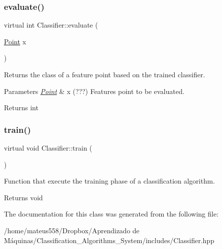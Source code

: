 \subsubsection{\texorpdfstring{evaluate()}{evaluate()}}
{\footnotesize\ttfamily virtual int Classifier\+::evaluate (\begin{DoxyParamCaption}\item[{\hyperlink{class_point}{Point}}]{x }\end{DoxyParamCaption})\hspace{0.3cm}{\ttfamily [pure virtual]}}



Returns the class of a feature point based on the trained classifier. 


\begin{DoxyParams}{Parameters}
{\em \hyperlink{class_point}{Point}} & x (???) Features point to be evaluated. \\
\hline
\end{DoxyParams}
\begin{DoxyReturn}{Returns}
int 
\end{DoxyReturn}
\mbox{\label{class_classifier_a4e2f077e6f1dce1ef0376a02b60e7c21}} 
\subsubsection{\texorpdfstring{train()}{train()}}
{\footnotesize\ttfamily virtual void Classifier\+::train (\begin{DoxyParamCaption}{ }\end{DoxyParamCaption})\hspace{0.3cm}{\ttfamily [pure virtual]}}



Function that execute the training phase of a classification algorithm. 

\begin{DoxyReturn}{Returns}
void 
\end{DoxyReturn}


The documentation for this class was generated from the following file\+:\begin{DoxyCompactItemize}
\item 
/home/mateus558/\+Dropbox/\+Aprendizado de Máquinas/\+Classification\+\_\+\+Algorithms\+\_\+\+System/includes/Classifier.\+hpp\end{DoxyCompactItemize}
